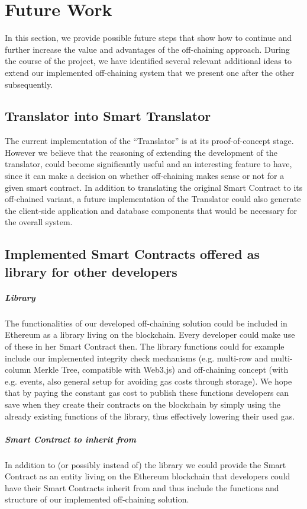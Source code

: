 \section{Future Work} \label{sec:future_work}

In this section, we provide possible future steps that show how to continue and further increase the value and advantages of the off-chaining approach. During the course of the project, we have identified several relevant additional ideas to extend our implemented off-chaining system that we present one after the other subsequently.

\subsection{Translator into Smart Translator}
The current implementation of the “Translator” is at its proof-of-concept stage. However we believe that the reasoning of extending the development of the translator, could become significantly useful and an interesting feature to have, since it can make a decision on whether off-chaining makes sense or not for a given smart contract. In addition to translating the original Smart Contract to its off-chained variant, a future implementation of the Translator could also generate the client-side application and database components that would be necessary for the overall system.

\subsection{Implemented Smart Contracts offered as library for other developers}
\subparagraph{Library}
The functionalities of our developed off-chaining solution could be included in Ethereum as a library living on the blockchain. Every developer could make use of these in her Smart Contract then. The library functions could for example include our implemented integrity check mechanisms (e.g. multi-row and multi-column Merkle Tree, compatible with Web3.js) and off-chaining concept (with e.g. events, also general setup for avoiding gas costs through storage). We hope that by paying the constant gas cost to publish these functions developers can save when they create their contracts on the blockchain by simply using the already existing functions of the library, thus effectively lowering their used gas.

\subparagraph{Smart Contract to inherit from}
In addition to (or possibly instead of) the library we could provide the Smart Contract as an entity living on the Ethereum blockchain that developers could have their Smart Contracts inherit from and thus include the functions and structure of our implemented off-chaining solution.

